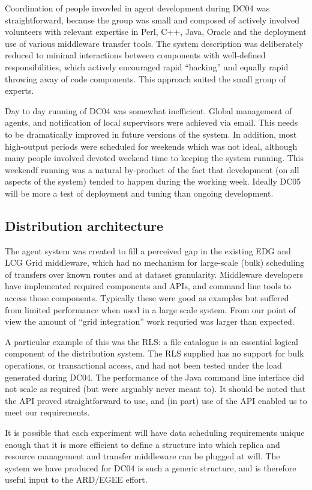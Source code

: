 \documentclass{cmspaper}
\begin{document}
Coordination of people invovled in agent development during DC04 was straightforward, 
because the group was small and composed of actively involved volunteers with relevant 
expertise in Perl, C++, Java, Oracle and the deployment use of various middleware 
transfer tools. The system description was deliberately reduced to minimal interactions
between components with well-defined responsibilities, which actively encouraged rapid
``hacking'' and equally rapid throwing away of code components. This approach suited the 
small group of experts.

Day to day running of DC04 was somewhat inefficient. Global management of agents, and 
notification of local supervisors were achieved via email. This needs to be dramatically
improved in future versions of the system. In addition, most high-output periods were
scheduled for weekends which was not ideal, although many people involved devoted weekend
time to keeping the system running. This weekendf running was a natural by-product of the 
fact that development (on all aspects of the system) tended to happen during the working
week. Ideally DC05 will be more a test of deployment and tuning than ongoing 
development.

\subsection{Distribution architecture}
The agent system was created to fill a perceived gap in the existing EDG and LCG Grid 
middleware, which had no mechanism for large-scale (bulk) scheduling of transfers over 
known routes and at dataset granularity. Middleware developers have implemented required
components and APIs, and command line tools to access those components. Typically these
were good as examples but suffered from limited performance when used in a large scale 
system. From our point of view the amount of ``grid integration'' work requried was larger
than expected.

A particular example of this was the RLS: a file catalogue is an essential logical 
component of the distribution system. The RLS supplied has no support for bulk operations,
or transactional access, and had not been tested under the load generated during DC04.
The performance of the Java command line interface did not scale as required (but were
arguably never meant to). It should be noted that the API proved straightforward to use,
and (in part) use of the API enabled us to meet our requirements.

It is possible that each experiment will have data scheduling requirements unique enough
that it is more efficient to define a structure into which replica and resource management
and transfer middleware can be plugged at will. The system we have produced for DC04 is
such a generic structure, and is therefore useful input to the ARD/EGEE effort.
\end{document}
